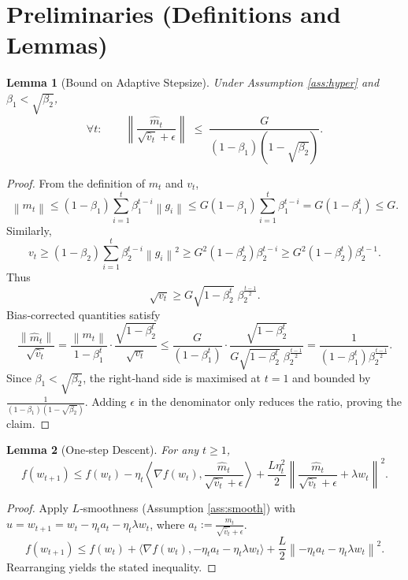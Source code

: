 \documentclass{article}
\newtheorem{lemma}{Lemma}
\newcommand{\norm}[1]{\left\|#1\right\|}
\begin{document}
\newpage
\section*{Preliminaries (Definitions and Lemmas)}
\begin{lemma}[Bound on Adaptive Stepsize]\label{lem:stepsize}
Under Assumption \ref{ass:hyper} and $\beta_1<\sqrt{\beta_2}$,
\[
    \forall t:\qquad
    \norm{\frac{\hat m_t}{\sqrt{\hat v_t}+\epsilon}}
    \;\le\;
    \frac{G}{(1-\beta_1)(1-\sqrt{\beta_2})}.
\]
\end{lemma}
\begin{proof}
From the definition of $m_t$ and $v_t$,
\[
    \norm{m_t}\le (1-\beta_1)\sum_{i=1}^{t}\beta_1^{t-i}\norm{g_i}
    \le G(1-\beta_1)\sum_{i=1}^{t}\beta_1^{t-i}
    = G(1-\beta_1^{t})\le G .
\]
Similarly,
\[
    v_t\ge (1-\beta_2)\sum_{i=1}^{t}\beta_2^{t-i}\norm{g_i}^{2}
    \ge G^{2}(1-\beta_2^{t})\beta_2^{t-i}\ge G^{2}(1-\beta_2^{t})\beta_2^{t-1}.
\]
Thus
\[
    \sqrt{v_t}\ge G\sqrt{1-\beta_2^{t}}\;\beta_2^{\frac{t-1}{2}} .
\]
Bias‑corrected quantities satisfy
\[
    \frac{\norm{\hat m_t}}{\sqrt{\hat v_t}}
    = \frac{\norm{m_t}}{1-\beta_1^{t}}\cdot
      \frac{\sqrt{1-\beta_2^{t}}}{\sqrt{v_t}}
    \le \frac{G}{(1-\beta_1^{t})}\cdot
          \frac{\sqrt{1-\beta_2^{t}}}{G\sqrt{1-\beta_2^{t}}\;\beta_2^{\frac{t-1}{2}}}
    = \frac{1}{(1-\beta_1^{t})\beta_2^{\frac{t-1}{2}}}.
\]
Since $\beta_1<\sqrt{\beta_2}$, the right‑hand side is maximised at $t=1$ and bounded by
$\frac{1}{(1-\beta_1)(1-\sqrt{\beta_2})}$. Adding $\epsilon$ in the denominator only reduces the ratio, proving the claim. \hfill\qedsymbol
\end{proof}

\begin{lemma}[One‑step Descent]\label{lem:descent}
For any $t\ge1$,
\[
    f(w_{t+1}) \le f(w_t) - \eta_t\left\langle\nabla f(w_t),\frac{\hat m_t}{\sqrt{\hat v_t}+\epsilon}\right\rangle
                 +\frac{L\eta_t^{2}}{2}\norm{\frac{\hat m_t}{\sqrt{\hat v_t}+\epsilon}+\lambda w_t}^{2}.
\]
\end{lemma}
\begin{proof}
Apply $L$‑smoothness (Assumption \ref{ass:smooth}) with $u=w_{t+1}=w_t-\eta_t a_t-\eta_t\lambda w_t$, where $a_t:=\frac{\hat m_t}{\sqrt{\hat v_t}+\epsilon}$.
\[
    f(w_{t+1})\le f(w_t)+\langle\nabla f(w_t),- \eta_t a_t-\eta_t\lambda w_t\rangle
                +\frac{L}{2}\norm{-\eta_t a_t-\eta_t\lambda w_t}^{2}.
\]
Rearranging yields the stated inequality. \hfill\qedsymbol
\end{proof}
\end{document}
